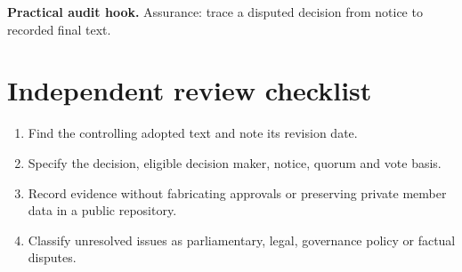 \documentclass[11pt]{article}
\begin{document}
\textbf{Practical audit hook.} Assurance: trace a disputed decision from notice to recorded final text.

\section{Independent review checklist}
\begin{enumerate}[leftmargin=*,itemsep=4pt]
\item Find the controlling adopted text and note its revision date.
\item Specify the decision, eligible decision maker, notice, quorum and vote basis.
\item Record evidence without fabricating approvals or preserving private member data in a public repository.
\item Classify unresolved issues as parliamentary, legal, governance policy or factual disputes.
\end{enumerate}
\end{document}
